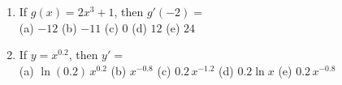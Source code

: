 \documentclass[fleqn,12pt]{article}
\newcommand{\<}{\ensuremath{\langle}}
\renewcommand{\>}{\ensuremath{\rangle}}
\begin{document}
\newcommand\probskip{\vskip2cm}

\bigskip

  \begin{enumerate}




  


  \item 
  If $g(x) = 2x^3 + 1$, then $g'(-2)=$
\\[8pt] 
(a) $-12$ \hfill
(b) $-11$ \hfill
(c) $0$ \hfill
(d) $12$ \hfill
(e) $24$


\item
\label{item:14}
If $y = x^{0.2}$, then $y' = $\\[7pt]
(a) $\ln(0.2)\, x^{0.2}$ \hfill
(b) $x^{-0.8}$\hfill
(c) $0.2\, x^{-1.2}$\hfill
(d) $0.2\ln x $\hfill
(e) $0.2\, x^{-0.8}$



\end{enumerate}
\end{document}
